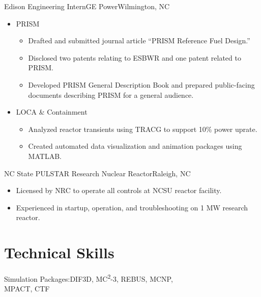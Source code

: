 \documentclass[letterpaper,11pt,nocolor,final]{moderncv}
\begin{document}
{Edison Engineering Intern}{GE Power}{Wilmington, NC}{}{
  \begin{itemize}
    \item PRISM 
    \begin{itemize}
      \item Drafted and submitted journal article ``PRISM Reference Fuel Design.''
      \item Disclosed two patents relating to ESBWR and one patent related to PRISM.
      \item Developed PRISM General Description Book and prepared public-facing documents describing PRISM for a general audience.
    \end{itemize}
    \item LOCA \& Containment 
    \begin{itemize}
      \item Analyzed reactor transients using TRACG to support 10\% power uprate.
      \item Created automated data visualization and animation packages using MATLAB.
    \end{itemize}
  \end{itemize}}

{NC State PULSTAR Research Nuclear Reactor}{Raleigh, NC}{}{
  \begin{itemize}
    \item Licensed by NRC to operate all controls at NCSU reactor facility.
    \item Experienced in startup, operation, and troubleshooting on 1 MW
      research reactor.
  \end{itemize}}


\clearpage
\section{Technical Skills}

{Simulation Packages:}{DIF3D, MC\textsuperscript{2}-3, REBUS, MCNP, \\
  MPACT, CTF}
\end{document}
